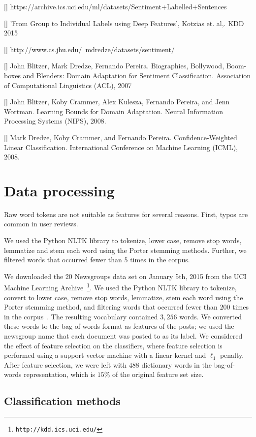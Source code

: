 \documentclass{article} %
\begin{document}
[] https://archive.ics.uci.edu/ml/datasets/Sentiment+Labelled+Sentences

[] 'From Group to Individual Labels using Deep Features', Kotzias et. al,. KDD 2015

[] http://www.cs.jhu.edu/~mdredze/datasets/sentiment/

[] John Blitzer, Mark Dredze, Fernando Pereira. Biographies, Bollywood, Boom-boxes and Blenders: Domain Adaptation for Sentiment Classification. Association of Computational Linguistics (ACL), 2007

[] John Blitzer, Koby Crammer, Alex Kulesza, Fernando Pereira, and Jenn Wortman. Learning Bounds for Domain Adaptation. Neural Information Processing Systems (NIPS), 2008.

[] Mark Dredze, Koby Crammer, and Fernando Pereira. Confidence-Weighted Linear Classification. International Conference on Machine Learning (ICML), 2008.

\section{Data processing}

Raw word tokens are not suitable as features for several reasons. First, typos are common in user reviews. 


We used the Python NLTK library to tokenize, lower case, remove stop words, lemmatize and stem each word using the Porter stemming methods. Further, we filtered words that occurred fewer than 5 times in the corpus.


We downloaded the 20 Newsgroups data set on January 5th, 2015 from the UCI Machine Learning Archive~\footnote{{\tt http://kdd.ics.uci.edu/}}. We used the Python NLTK library to tokenize, convert to lower case, remove stop words, lemmatize, stem each word using the Porter stemming method, and filtering words that occurred fewer than $200$ times in the corpus~\cite{bird2009}. The resulting vocabulary contained $3,256$ words. We converted these words to the bag-of-words format as features of the posts; we used the newsgroup name that each document was posted to as its label. We considered the effect of feature selection on the classifiers, where feature selection is performed using a support vector machine with a linear kernel and $\ell_1$ penalty. After feature selection, we were left with $488$ dictionary words in the bag-of-words representation, which is $15\%$ of the original feature set size.

\subsection{Classification methods}
\end{document}
